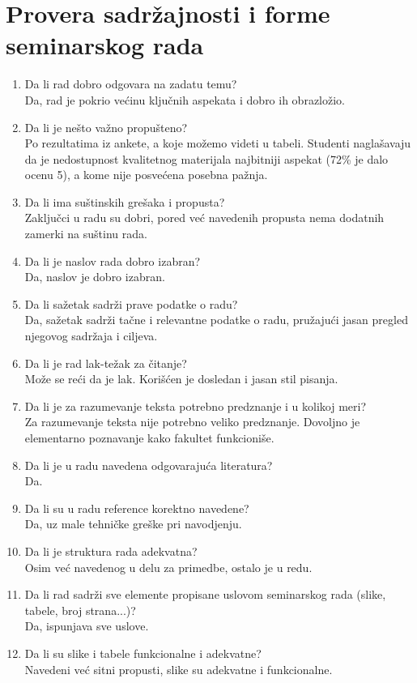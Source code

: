 \documentclass[a4paper]{report}
\begin{document}
\section{Provera sadržajnosti i forme seminarskog rada}


\begin{enumerate}
\item Da li rad dobro odgovara na zadatu temu?\\
Da, rad je pokrio većinu ključnih aspekata i dobro ih obrazložio. 
\item Da li je nešto važno propušteno?\\
Po rezultatima iz ankete, a koje možemo videti u tabeli. Studenti naglašavaju da je nedostupnost kvalitetnog materijala najbitniji aspekat (72\% je dalo ocenu 5), a kome nije posvećena posebna pažnja. 
\item Da li ima suštinskih grešaka i propusta?\\
Zaključci u radu su dobri, pored već navedenih propusta nema dodatnih zamerki na suštinu rada.
\item Da li je naslov rada dobro izabran?\\
Da, naslov je dobro izabran.
\item Da li sažetak sadrži prave podatke o radu?\\
Da, sažetak sadrži tačne i relevantne podatke o radu, pružajući jasan pregled njegovog sadržaja i ciljeva.
\item Da li je rad lak-težak za čitanje?\\
Može se reći da je lak. Korišćen je dosledan i jasan stil pisanja.
\item Da li je za razumevanje teksta potrebno predznanje i u kolikoj meri?\\
Za razumevanje teksta nije potrebno veliko predznanje. Dovoljno je elementarno poznavanje kako fakultet funkcioniše.
\item Da li je u radu navedena odgovarajuća literatura?\\
Da.
\item Da li su u radu reference korektno navedene?\\
Da, uz male tehničke greške pri navodjenju.
\item Da li je struktura rada adekvatna?\\
Osim već navedenog u delu za primedbe, ostalo je u redu.
\item Da li rad sadrži sve elemente propisane uslovom seminarskog rada (slike, tabele, broj strana...)?\\
Da, ispunjava sve uslove.
\item Da li su slike i tabele funkcionalne i adekvatne?\\
Navedeni već sitni propusti, slike su adekvatne i funkcionalne.
\end{enumerate}
\end{document}
